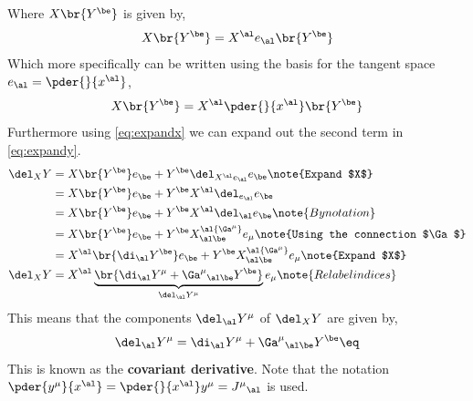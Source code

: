 \documentclass{article}
\begin{document}
Where $X\br{Y^\be}$ is given by,
\[ X\br{Y^\be} = X^\al e_\al \br{Y^\be} \]
Which more specifically can be written using the basis for the tangent space $e_\al = \pder{}{x^\al}$,
\[ X\br{Y^\be} = X^\al \pder{}{x^\al} \br{Y^\be} \]
Furthermore using \eqref{eq:expandx} we can expand out the second term in \eqref{eq:expandy}.
\begin{align*}
\del_X Y &= X\br{Y^\be} e_\be + Y^\be \del_{X^\al e_\al} e_\be \note{Expand $X$}\\
&= X\br{Y^\be} e_\be + Y^\be X^\al \del_{e_\al} e_\be \\
&= X\br{Y^\be} e_\be + Y^\be X^\al \del_{\al} e_\be \note{By notation}\\
&= X\br{Y^\be} e_\be + Y^\be X^\al {\Ga^\mu}_{\al\be} e_\mu \note{Using the connection $\Ga$} \\
&= X^\al \br{\di_\al Y^\be} e_\be + Y^\be X^\al {\Ga^\mu}_{\al\be} e_\mu \note{Expand $X$}\\
\del_X Y &= X^\al \underbrace{\br{\di_\al Y^\mu +  {\Ga^\mu}_{\al\be}Y^\be}}_{\del_\al Y^\mu} e_\mu \note{Relabel indices}\\
\end{align*}
This means that the components $\del_\al Y^\mu$ of $\del_X Y$ are given by,
\[ \del_\al Y^\mu = \di_\al Y^\mu +  {\Ga^\mu}_{\al\be}Y^\be \eq \label{eq:covariantderivative} \]
This is known as the \textbf{covariant derivative}. Note that the notation $\pder{y^\mu}{x^\al} = \pder{}{x^\al}y^\mu = {J^\mu}_\al$ is used.
\end{document}
